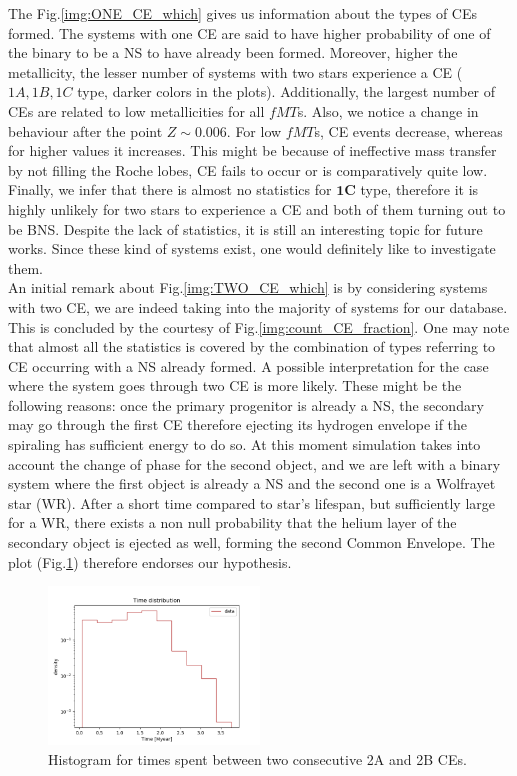 \documentclass[preprint,12pt]{elsarticle}
\begin{document}
The Fig.\ref{img:ONE_CE_which} gives us information about the types of CEs formed. The systems with one CE are said to have higher probability of one of the binary to be a NS to have already been formed. Moreover, higher the metallicity, the lesser number of systems with two stars experience a CE ($1A, 1B, 1C$ type, darker colors in the plots). Additionally, the largest number of CEs are related to low metallicities for all $fMT$s. Also, we notice a change in behaviour after the point $Z \sim 0.006$. For low $fMT$s, CE events decrease, whereas for higher values it increases. This might be because of ineffective mass transfer by not filling the Roche lobes, CE fails to occur or is comparatively quite low. Finally, we infer that there is almost no statistics for $\mathbf{1C}$ type, therefore it is highly unlikely for two stars to experience a CE and both of them turning out to be BNS. Despite the lack of statistics, it is still an interesting topic for future works. Since these kind of systems exist, one would definitely like to investigate them.\\

An initial remark about Fig.\ref{img:TWO_CE_which} is by considering systems with two CE, we are indeed taking into the majority of systems for our database. This is concluded by the courtesy of Fig.\ref{img:count_CE_fraction}. One may note that almost all the statistics is covered by the combination of types referring to CE occurring with a NS already formed. A possible interpretation for the case where the system goes through two CE is more likely. These might be the following reasons: once the primary progenitor is already a NS, the secondary may go through the first CE therefore ejecting its hydrogen envelope if the spiraling has sufficient energy to do so. At this moment simulation takes into account the change of phase for the second object, and we are left with a binary system where the first object is already a NS and the second one is a Wolfrayet star (WR). After a short time compared to star's lifespan, but sufficiently large for a WR, there exists a non null probability that the helium layer of the secondary object is ejected as well, forming the second Common Envelope. The plot (Fig.\ref{img:diff_time_2A_2B}) therefore endorses our hypothesis. 

\begin{figure}[h!]
    \centering
    \includegraphics[width=0.5\textwidth]{Images/2A_2B_time_difference.png}
    \caption{Histogram for times spent between two consecutive 2A and 2B CEs.}
    \label{img:diff_time_2A_2B}
\end{figure}
\\
\end{document}
